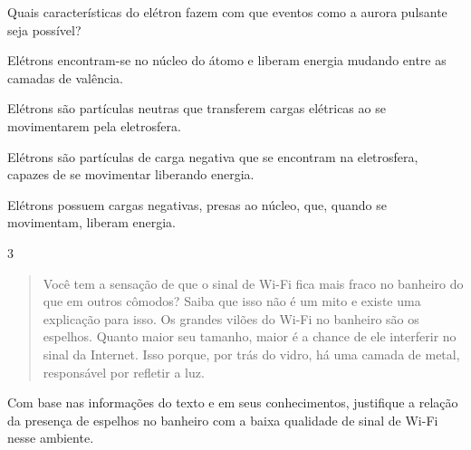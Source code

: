 {{Quais características do elétron fazem com que eventos como a aurora
pulsante seja possível?

\begin{escolha}
\item
  Elétrons encontram-se no núcleo do átomo e liberam energia mudando entre as camadas de valência.
\item
  Elétrons são partículas neutras que transferem cargas elétricas ao se movimentarem pela eletrosfera.
\item
  Elétrons são partículas de carga negativa que se encontram na eletrosfera, capazes de se movimentar liberando energia.
\item
  Elétrons possuem cargas negativas, presas ao núcleo, que, quando se movimentam, liberam energia.
\end{escolha}


\num{3}

\begin{quote}  
Você tem a sensação de que o sinal de Wi-Fi fica mais fraco no
banheiro do que em outros cômodos? Saiba que isso não é um mito e
existe uma explicação para isso. Os grandes vilões do Wi-Fi no
banheiro são os espelhos. Quanto maior seu tamanho, maior é a chance
de ele interferir no sinal da Internet. Isso porque, por trás do
vidro, há uma camada de metal, responsável por refletir a luz.

\end{quote}

Com base nas informações do texto e em seus conhecimentos, justifique a
relação da presença de espelhos no banheiro com a baixa qualidade de
sinal de Wi-Fi nesse ambiente.

}}
